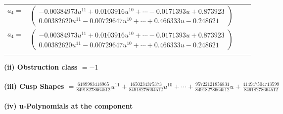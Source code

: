 \documentclass[1p]{elsarticle_modified}
\theoremstyle{definition}
\begin{document}
\begin{tabular}{m{7pt} m{180pt} m{7pt} m{180pt} }
\flushright $a_{4}=$&$\begin{pmatrix}-0.00384973 u^{11}+0.0103916 u^{10}+\cdots-0.0171393 u+0.873923\\0.00382620 u^{11}-0.00729647 u^{10}+\cdots+0.466333 u-0.248621\end{pmatrix}$\\ \flushright $a_{4}=$&$\begin{pmatrix}-0.00384973 u^{11}+0.0103916 u^{10}+\cdots-0.0171393 u+0.873923\\0.00382620 u^{11}-0.00729647 u^{10}+\cdots+0.466333 u-0.248621\end{pmatrix}$\\&\end{tabular}
\flushleft \textbf{(ii) Obstruction class $= -1$}\\~\\
\flushleft \textbf{(iii) Cusp Shapes $= \frac{6189983418965}{84918278664512} u^{11}+\frac{1650234375373}{84918278664512} u^{10}+\cdots+\frac{95722121856831}{84918278664512} u+\frac{414947504713599}{84918278664512}$}\\~\\
\newpage\renewcommand{\arraystretch}{1}
\flushleft \textbf{(iv) u-Polynomials at the component}\newline \\
\end{document}
